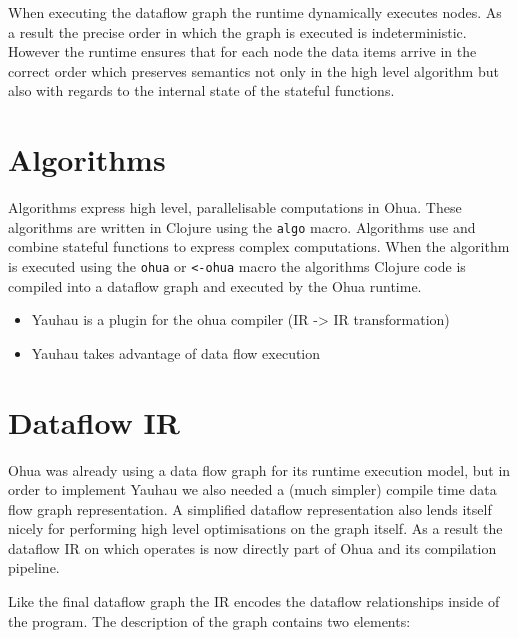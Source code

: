 When executing the dataflow graph the runtime dynamically executes nodes.
As a result the precise order in which the graph is executed is indeterministic.
However the runtime ensures that for each node the data items arrive in the correct order which preserves semantics not only in the high level algorithm but also with regards to the internal state of the stateful functions.

\section{Algorithms}

Algorithms express high level, parallelisable computations in Ohua.
These algorithms are written in Clojure using the \texttt{algo} macro.
Algorithms use and combine stateful functions to express complex computations.
When the algorithm is executed using the \texttt{ohua} or \texttt{<-ohua} macro the algorithms Clojure code is compiled into a dataflow graph and executed by the Ohua runtime.

\begin{itemize}
	\item Yauhau is a plugin for the ohua compiler (IR -> IR transformation)
	\item Yauhau takes advantage of data flow execution
\end{itemize}

\section{Dataflow IR}

Ohua was already using a data flow graph for its runtime execution model, but in order to implement Yauhau we also needed a (much simpler) compile time data flow graph representation.
A simplified dataflow representation also lends itself nicely for performing high level optimisations on the graph itself.
As a result the dataflow IR on which \yauhau{} operates is now directly part of Ohua and its compilation pipeline.

Like the final dataflow graph the IR encodes the dataflow relationships inside of the program.
The description of the graph contains two elements:

